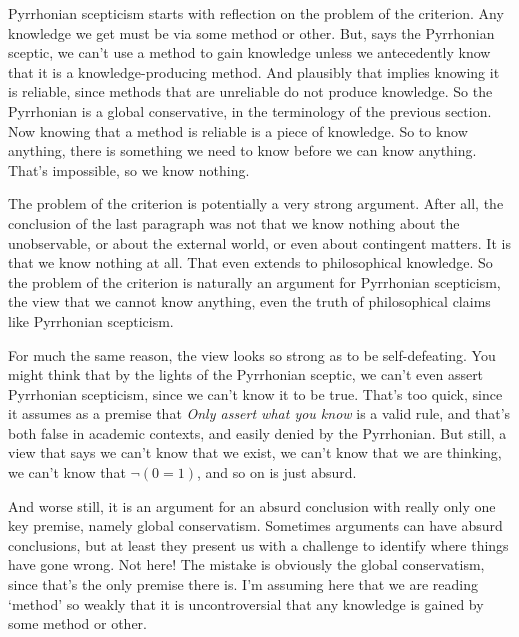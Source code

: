 Pyrrhonian scepticism starts with reflection on the problem of the criterion. Any knowledge we get must be via some method or other. But, says the Pyrrhonian sceptic, we can't use a method to gain knowledge unless we antecedently know that it is a knowledge-producing method. And plausibly that implies knowing it is reliable, since methods that are unreliable do not produce knowledge. So the Pyrrhonian is a global conservative, in the terminology of the previous section. Now knowing that a method is reliable is a piece of knowledge. So to know anything, there is something we need to know before we can know anything. That's impossible, so we know nothing.

The problem of the criterion is potentially a very strong argument. After all, the conclusion of the last paragraph was not that we know nothing about the unobservable, or about the external world, or even about contingent matters. It is that we know nothing at all. That even extends to philosophical knowledge. So the problem of the criterion is naturally an argument for Pyrrhonian scepticism, the view that we cannot know anything, even the truth of philosophical claims like Pyrrhonian scepticism.

For much the same reason, the view looks so strong as to be self-defeating. You might think that by the lights of the Pyrrhonian sceptic, we can't even assert Pyrrhonian scepticism, since we can't know it to be true. That's too quick, since it assumes as a premise that \emph{Only assert what you know} is a valid rule, and that's both false in academic contexts, and easily denied by the Pyrrhonian. But still, a view that says we can't know that we exist, we can't know that we are thinking, we can't know that $\neg (0 = 1)$, and so on is just absurd.

And worse still, it is an argument for an absurd conclusion with really only one key premise, namely global conservatism. Sometimes arguments can have absurd conclusions, but at least they present us with a challenge to identify where things have gone wrong. Not here! The mistake is obviously the global conservatism, since that's the only premise there is. I'm assuming here that we are reading `method' so weakly that it is uncontroversial that any knowledge is gained by some method or other.

